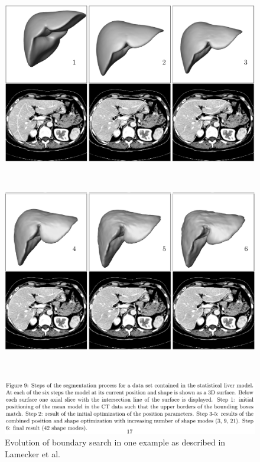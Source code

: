 \documentclass[]{article}
\begin{document}
\begin{figure}[ht!]
	\centering
	\begin{minipage}{0.7\linewidth}
		\includegraphics[width=\linewidth]{images/image5}
	\end{minipage}\\
	\begin{minipage}{0.7\linewidth}
		\includegraphics[width=\linewidth]{images/image13}
	\end{minipage}\\
	\begin{minipage}{0.7\linewidth}
		\includegraphics[width=\linewidth]{images/image18}
	\end{minipage}
	\caption{Evolution of boundary search in one example as described in Lamecker et al. \cite{Lamecker2004}}
	\label{Lamecker2004_Fig9}
\end{figure}
\end{document}
